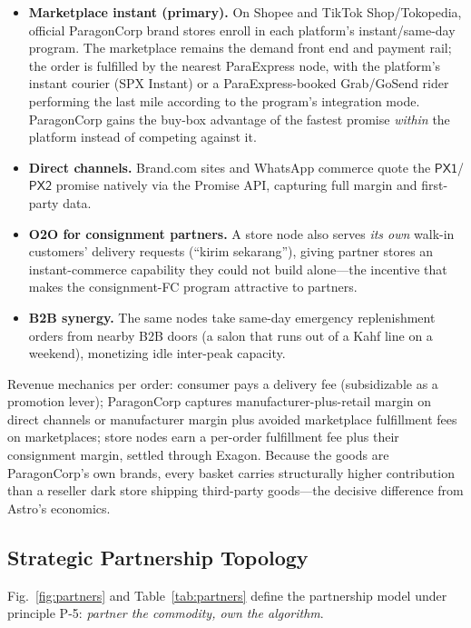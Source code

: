 \documentclass[journal]{IEEEtran}
\begin{document}
\begin{itemize}[leftmargin=*]
  \item \textbf{Marketplace instant (primary).} On Shopee and TikTok Shop/Tokopedia, official ParagonCorp brand stores enroll in each platform's instant/same-day program. The marketplace remains the demand front end and payment rail; the order is fulfilled by the nearest ParaExpress node, with the platform's instant courier (SPX Instant) or a ParaExpress-booked Grab/GoSend rider performing the last mile according to the program's integration mode. ParagonCorp gains the buy-box advantage of the fastest promise \emph{within} the platform instead of competing against it.
  \item \textbf{Direct channels.} Brand.com sites and WhatsApp commerce quote the $\mathsf{PX1}$/$\mathsf{PX2}$ promise natively via the Promise API, capturing full margin and first-party data.
  \item \textbf{O2O for consignment partners.} A store node also serves \emph{its own} walk-in customers' delivery requests (``kirim sekarang''), giving partner stores an instant-commerce capability they could not build alone---the incentive that makes the consignment-FC program attractive to partners.
  \item \textbf{B2B synergy.} The same nodes take same-day emergency replenishment orders from nearby B2B doors (a salon that runs out of a Kahf line on a weekend), monetizing idle inter-peak capacity.
\end{itemize}

Revenue mechanics per order: consumer pays a delivery fee (subsidizable as a promotion lever); ParagonCorp captures manufacturer-plus-retail margin on direct channels or manufacturer margin plus avoided marketplace fulfillment fees on marketplaces; store nodes earn a per-order fulfillment fee plus their consignment margin, settled through Exagon. Because the goods are ParagonCorp's own brands, every basket carries structurally higher contribution than a reseller dark store shipping third-party goods---the decisive difference from Astro's economics.

\subsection{Strategic Partnership Topology}
Fig.~\ref{fig:partners} and Table~\ref{tab:partners} define the partnership model under principle P-5: \emph{partner the commodity, own the algorithm}.
\end{document}
